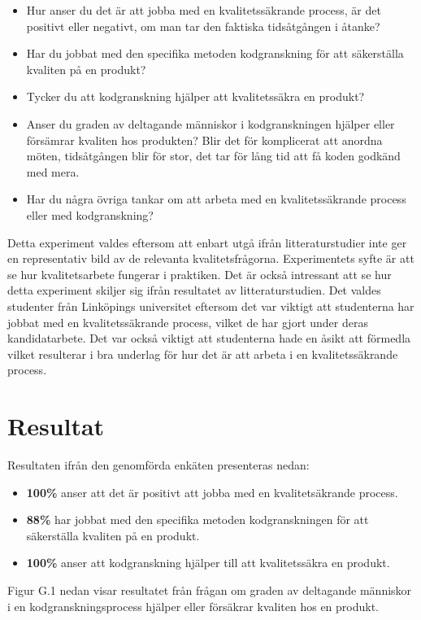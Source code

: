 \begin{itemize}
	\item Hur anser du det är att jobba med en kvalitetssäkrande process, är det positivt eller negativt, om man tar den faktiska tidsåtgången i åtanke?
	\item Har du jobbat med den specifika metoden kodgranskning för att säkerställa kvaliten på en produkt?
	\item Tycker du att kodgranskning hjälper att kvalitetssäkra en produkt?
	\item Anser du graden av deltagande människor i kodgranskningen hjälper eller försämrar kvaliten hos produkten? Blir det för komplicerat att anordna möten, tidsåtgången blir för stor, det tar för lång tid att få koden godkänd med mera.
	\item Har du några övriga tankar om att arbeta med en kvalitetssäkrande process eller med kodgranskning?
\end{itemize}

Detta experiment valdes eftersom att enbart utgå ifrån litteraturstudier inte ger en representativ bild av de relevanta kvalitetsfrågorna. Experimentets syfte är att se hur kvalitetsarbete fungerar i praktiken. Det är också intressant att se hur detta experiment skiljer sig ifrån resultatet av litteraturstudien. Det valdes studenter från Linköpings universitet eftersom det var viktigt att studenterna har jobbat med en kvalitetssäkrande process, vilket de har gjort under deras kandidatarbete. Det var också viktigt att studenterna hade en åsikt att förmedla vilket resulterar i bra underlag för hur det är att arbeta i en kvalitetssäkrande process. 

\section{Resultat}
\label{sec:results-wallstrom}

Resultaten ifrån den genomförda enkäten presenteras nedan:

\begin{itemize}
	\item \textbf{100\%} anser att det är positivt att jobba med en kvalitetsäkrande process.
	\item \textbf{88\%} har jobbat med den specifika metoden kodgranskningen för att säkerställa kvaliten på en produkt.
	\item \textbf{100\%} anser att kodgranskning hjälper till att kvalitetssäkra en produkt.
\end{itemize}
Figur G.1 nedan visar resultatet från frågan om graden av deltagande människor i en kodgranskningsprocess hjälper eller försäkrar kvaliten hos en produkt.

